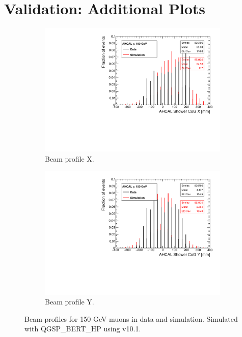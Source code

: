 \chapter{Validation: Additional Plots}
\label{appendix:SimulationVal}

\begin{figure}[htbp!]
  \centering
  \begin{subfigure}[t]{0.49\textwidth}
    \includegraphics[width=1.\linewidth]{../Thesis_Plots/Timing/Muons/Plots/BeamProfileX.pdf}
    \caption{Beam profile X.} \label{fig:mu150GeVX}
  \end{subfigure}
  \hfill
  \begin{subfigure}[t]{0.49\textwidth}
    \includegraphics[width=1.\linewidth]{../Thesis_Plots/Timing/Muons/Plots/BeamProfileY.pdf}
    \caption{Beam profile Y.} \label{fig:mu150GeVY}
  \end{subfigure}
  \caption{Beam profiles for 150 GeV muons in data and simulation. Simulated with QGSP\_BERT\_HP using \geant v10.1.}
  \label{fig:BPmu}
\end{figure}

